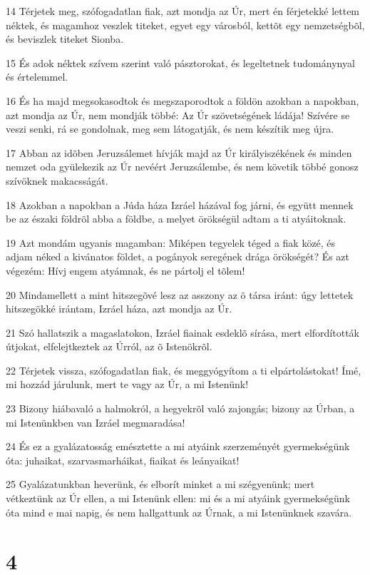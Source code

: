 \par 14 Térjetek meg, szófogadatlan fiak, azt mondja az Úr, mert én férjetekké lettem néktek, és  magamhoz veszlek titeket, egyet egy városból, kettõt egy nemzetségbõl, és beviszlek titeket Sionba.
\par 15 És adok néktek szívem szerint való pásztorokat, és legeltetnek tudománynyal és értelemmel.
\par 16 És ha majd megsokasodtok és megszaporodtok a földön azokban a napokban, azt mondja az Úr, nem mondják többé: Az Úr szövetségének ládája! Szívére se veszi senki, rá se gondolnak, meg sem látogatják, és nem készítik meg újra.
\par 17 Abban az idõben Jeruzsálemet hívják majd az Úr királyiszékének és minden nemzet oda gyülekezik az Úr nevéért Jeruzsálembe, és nem követik többé gonosz szívöknek makacsságát.
\par 18 Azokban a napokban a Júda háza Izráel házával fog járni, és együtt mennek be az északi földrõl abba a földbe, a melyet örökségül adtam a ti atyáitoknak.
\par 19 Azt mondám ugyanis magamban: Miképen tegyelek téged a fiak közé, és adjam néked a kivánatos földet, a pogányok seregének drága örökségét? És azt végezém: Hívj engem atyámnak, és ne pártolj el tõlem!
\par 20 Mindamellett a mint hitszegõvé lesz az asszony az õ társa iránt: úgy lettetek hitszegõkké irántam, Izráel háza, azt mondja az Úr.
\par 21 Szó hallatszik a magaslatokon, Izráel fiainak esdeklõ sírása, mert elfordították útjokat, elfelejtkeztek az Úrról, az õ Istenökrõl.
\par 22 Térjetek vissza, szófogadatlan fiak, és meggyógyítom a ti elpártolástokat! Ímé, mi hozzád járulunk, mert te vagy az Úr, a mi Istenünk!
\par 23 Bizony hiábavaló a halmokról, a hegyekrõl való zajongás; bizony az Úrban, a mi Istenünkben van Izráel megmaradása!
\par 24 És ez a gyalázatosság emésztette a mi atyáink szerzeményét gyermekségünk óta: juhaikat, szarvasmarháikat, fiaikat és leányaikat!
\par 25 Gyalázatunkban heverünk, és elborít minket a mi szégyenünk; mert vétkeztünk az Úr ellen, a mi Istenünk ellen: mi és a mi atyáink gyermekségünk óta mind e mai napig, és nem hallgattunk az Úrnak, a mi Istenünknek szavára.

\chapter{4}

